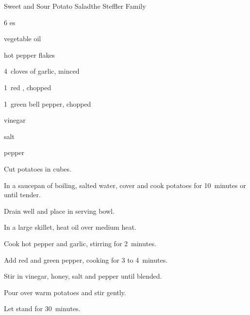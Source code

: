 \begin{recipe}{Sweet and Sour Potato Salad}{the Steffler Family}{}

\begin{ingredients}
\item 6 es
\item {} vegetable oil
\item hot pepper flakes
\item 4~cloves of garlic, minced
\item 1~red , chopped
\item 1~green bell pepper, chopped
\item \C{\third} vinegar
\item {} 
\item \tp{\half} salt
\item \tp{\half} pepper
\end{ingredients}

\begin{directions}
\item Cut potatoes in  cubes.
\item In a saucepan of boiling, salted water, cover and cook potatoes for 10~minutes or until tender.
\item Drain well and place in serving bowl.
\item In a large skillet, heat oil over medium heat.
\item Cook hot pepper and garlic, stirring for 2~minutes.
\item Add red and green pepper, cooking for 3 to 4~minutes.
\item Stir in vinegar, honey, salt and pepper until blended.
\item Pour over warm potatoes and stir gently.
\item Let stand for 30~minutes.
\end{directions}
\end{recipe}
